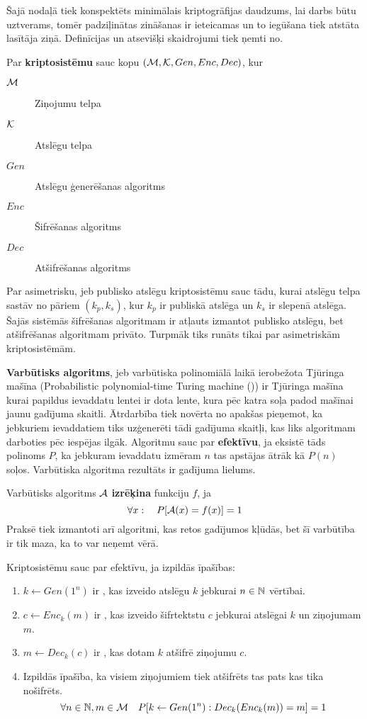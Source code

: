 Šajā nodaļā tiek konspektēts minimālais kriptogrāfijas daudzums, lai darbs būtu uztverams, tomēr padziļinātas zināšanas ir ieteicamas un to iegūšana tiek atstāta lasītāja ziņā. Definīcijas un atsevišķi skaidrojumi tiek ņemti no\cite{pass10}.

Par \textbf{kriptosistēmu} sauc kopu $(\mathcal{M}, \mathcal{K}, Gen, Enc, Dec)$, kur
\begin{description}
    \item[$\mathcal{M}$]Ziņojumu telpa
    \item[$\mathcal{K}$]Atslēgu telpa
    \item[$Gen$]Atslēgu ģenerēšanas algoritms
    \item[$Enc$]Šifrēšanas algoritms
    \item[$Dec$]Atšifrēšanas algoritms
\end{description}

Par asimetrisku, jeb publisko atslēgu kriptosistēmu sauc tādu, kurai atslēgu telpa sastāv no pāriem $(k_p, k_s)$, kur $k_p$ ir publiskā atslēga un $k_s$ ir slepenā atslēga. Šajās sistēmās šifrēšanas algoritmam ir atļauts izmantot publisko atslēgu, bet atšifrēšanas algoritmam privāto. Turpmāk tiks runāts tikai par asimetriskām kriptosistēmām.

\textbf{Varbūtisks algoritms}, jeb varbūtiska polinomiālā laikā ierobežota Tjūringa mašīna (Probabilistic polynomial-time Turing machine (\ppt)) ir Tjūringa mašīna kurai papildus ievaddatu lentei ir dota lente, kura pēc katra soļa padod mašīnai jaunu gadījuma skaitli. Ātrdarbība tiek novērta no apakšas pieņemot, ka jebkuriem ievaddatiem tiks uzģenerēti tādi gadījuma skaitļi, kas liks algoritmam darboties pēc iespējas ilgāk. Algoritmu sauc par \textbf{efektīvu}, ja eksistē tāds polinoms $P$, ka jebkuram ievaddatu izmēram $n$ tas apstājas ātrāk kā $P(n)$ soļos. Varbūtiska algoritma rezultāts ir gadījuma lielums.

Varbūtisks algoritms $\mathcal{A}$ \textbf{izrēķina} funkciju $f$, ja
$$ \forall x : \quad P[\mathcal{A}(x) = f(x)] = 1 $$
Praksē tiek izmantoti arī algoritmi, kas retos gadījumos kļūdās, bet šī varbūtība ir tik maza, ka to var neņemt vērā.

Kriptosistēmu sauc par efektīvu, ja izpildās īpašības:
\begin{enumerate}
    \item $k \leftarrow Gen(1^n)$ ir \ppt, kas izveido atslēgu $k$ jebkurai $n\in\mathbb{N}$ vērtībai.
    \item $c \leftarrow Enc_k(m)$ ir \ppt, kas izveido šifrtektstu $c$ jebkurai atslēgai $k$ un ziņojumam $m$.
    \item $m \leftarrow Dec_k(c)$ ir \ppt, kas dotam $k$ atšifrē ziņojumu $c$.
    \item Izpildās īpašība, ka visiem ziņojumiem tiek atšifrēts tas pats kas tika nošifrēts.
        $$ \forall n\in\mathbb{N}, m\in\mathcal{M} \quad P[k\leftarrow Gen(1^n): Dec_k(Enc_k(m)) = m] = 1 $$
\end{enumerate}

